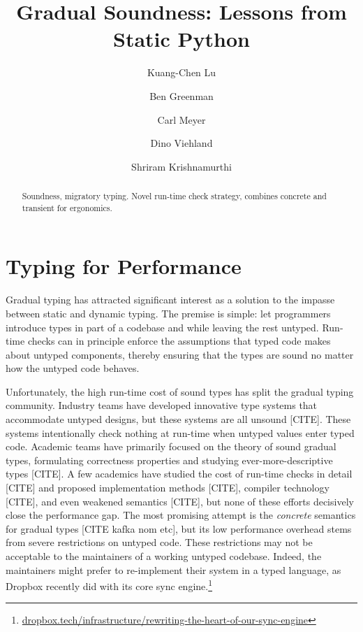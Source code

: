\documentclass[a4paper,english,cleveref,autoref,thm-restate,anonymous,]{lipics-v2021}
\title{Gradual Soundness: Lessons from Static Python}
\author{Kuang-Chen Lu}{Department of Computer Science, Brown University, USA}{LuKuangchen1024@gmail.com}{}{}
\author{Ben Greenman}{Department of Computer Science, Brown University, USA}{benjamin.l.greenman@gmail.com}{0000-0001-7078-9287}{}
\author{Carl Meyer}{Facebook, Inc.}{carljm@fb.com}{}{}
\author{Dino Viehland}{Facebook, Inc.}{dinoviehland@fb.com}{}{}
\author{Shriram Krishnamurthi}{Department of Computer Science, Brown University, USA}{shriram@brown.edu}{0000-0001-5184-1975}{}
\begin{document}
\maketitle

\newcommand{\shorturl}[2]{\href{#1#2}{#2}}
\newcommand{\SP}{Static Python}
\newcommand{\code}[1]{\texttt{#1}}


\begin{abstract}
  Soundness, migratory typing.
  Novel run-time check strategy, combines concrete and transient for ergonomics.
\end{abstract}


\section{Typing for Performance}
\label{s:intro}

Gradual typing has attracted significant interest as a solution to
the impasse between static and dynamic typing.
The premise is simple: let programmers introduce types in part of a
codebase and while leaving the rest untyped.
Run-time checks can in principle enforce the assumptions that
typed code makes about untyped components, thereby ensuring that
the types are sound no matter how the untyped code behaves.

Unfortunately, the high run-time cost of sound types has split
the gradual typing community.
Industry teams have developed innovative type systems that accommodate
untyped designs, but these systems are all unsound [CITE].
These systems intentionally check nothing at run-time when untyped values enter
typed code.
Academic teams have primarily focused on the theory of sound
gradual types, formulating correctness properties and studying ever-more-descriptive types [CITE].
A few academics have studied the cost of run-time checks
in detail [CITE] and proposed implementation methods [CITE],
compiler technology [CITE],
and even weakened semantics [CITE], but none of these efforts
decisively close the performance gap.
The most promising attempt is the \emph{concrete} semantics
for gradual types [CITE kafka nom etc], but its low performance
overhead stems from severe restrictions on untyped code.
These restrictions may not be acceptable to the maintainers of a
working untyped codebase.
Indeed, the maintainers might prefer to re-implement their system
in a typed language, as Dropbox recently did with its core sync
engine.\footnote{\shorturl{https://}{dropbox.tech/infrastructure/rewriting-the-heart-of-our-sync-engine}}
\end{document}
